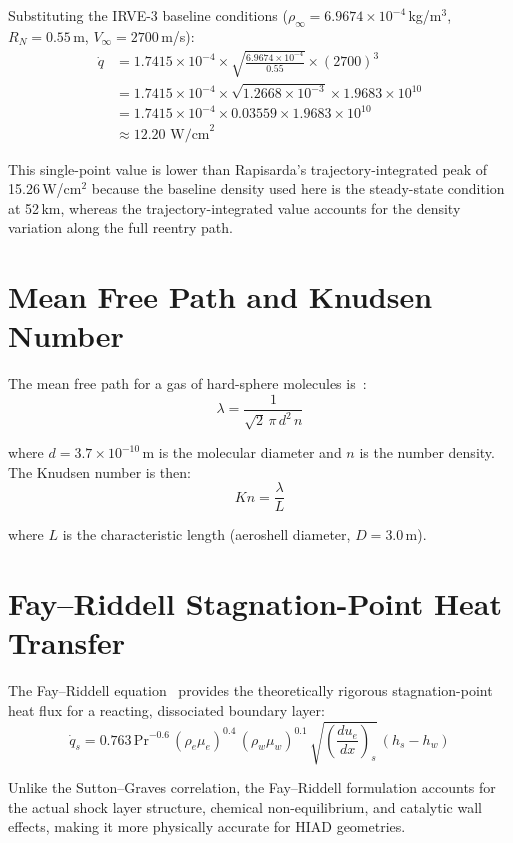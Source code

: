 Substituting the IRVE-3 baseline conditions ($\rho_\infty = 6.9674 \times 10^{-4}$\,kg/m$^3$, $R_N = 0.55$\,m, $V_\infty = 2700$\,m/s):
\begin{align}
    \dot{q} &= 1.7415 \times 10^{-4} \times \sqrt{\frac{6.9674 \times 10^{-4}}{0.55}} \times (2700)^3 \nonumber \\
    &= 1.7415 \times 10^{-4} \times \sqrt{1.2668 \times 10^{-3}} \times 1.9683 \times 10^{10} \nonumber \\
    &= 1.7415 \times 10^{-4} \times 0.03559 \times 1.9683 \times 10^{10} \nonumber \\
    &\approx 12.20 \text{ W/cm}^2
    \label{eq:sg_baseline}
\end{align}

\noindent This single-point value is lower than Rapisarda's trajectory-integrated peak of 15.26\,W/cm$^2$ because the baseline density used here is the steady-state condition at 52\,km, whereas the trajectory-integrated value accounts for the density variation along the full reentry path.

\section{Mean Free Path and Knudsen Number}

The mean free path for a gas of hard-sphere molecules is~\cite{bird1994molecular}:
\begin{equation}
    \lambda = \frac{1}{\sqrt{2} \, \pi \, d^2 \, n}
    \label{eq:mfp_derivation}
\end{equation}

\noindent where $d = 3.7 \times 10^{-10}$\,m is the molecular diameter and $n$ is the number density. The Knudsen number is then:
\begin{equation}
    Kn = \frac{\lambda}{L}
    \label{eq:kn_derivation}
\end{equation}

\noindent where $L$ is the characteristic length (aeroshell diameter, $D = 3.0$\,m).

\section{Fay--Riddell Stagnation-Point Heat Transfer}

The Fay--Riddell equation~\cite{fay1958stagnation} provides the theoretically rigorous stagnation-point heat flux for a reacting, dissociated boundary layer:
\begin{equation}
    \dot{q}_s = 0.763 \, \text{Pr}^{-0.6} \, (\rho_e \mu_e)^{0.4} \, (\rho_w \mu_w)^{0.1} \, \sqrt{\left(\frac{du_e}{dx}\right)_s} \, (h_s - h_w)
    \label{eq:fay_riddell}
\end{equation}

\noindent Unlike the Sutton--Graves correlation, the Fay--Riddell formulation accounts for the actual shock layer structure, chemical non-equilibrium, and catalytic wall effects, making it more physically accurate for HIAD geometries.
